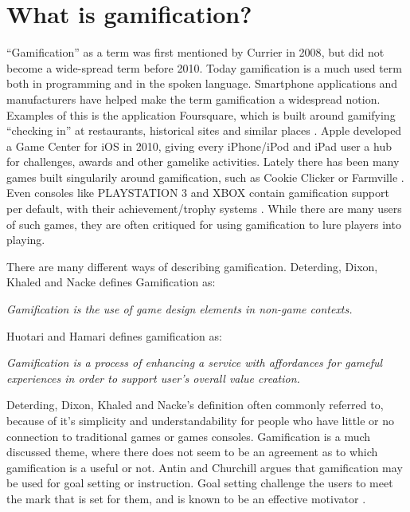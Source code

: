 \section{What is gamification?}
\label{sec:gamification}

``Gamification'' as a term was first mentioned by Currier in 2008\cite{gamificationcurrier}, but did not become a wide-spread term before 2010. Today gamification is a much used term both in programming and in the spoken language. Smartphone applications and manufacturers have helped make the term gamification a widespread notion. Examples of this is the application Foursquare, which is built around gamifying ``checking in'' at restaurants, historical sites and similar places \cite{foursquare}. Apple developed a Game Center for iOS in 2010, giving every iPhone/iPod and iPad user a hub for challenges, awards and other gamelike activities\cite{applegamecenter}. Lately there has been many games built singularily around gamification, such as Cookie Clicker \cite{cookieclicker} or Farmville \cite{farmville}. Even consoles like PLAYSTATION 3 and XBOX contain gamification support per default, with their achievement/trophy systems \cite{xbox, playstation}. While there are many users of such games, they are often critiqued for using gamification to lure players into playing. 

There are many different ways of describing gamification. Deterding, Dixon, Khaled and Nacke\cite{Deterding:2011:GDE:2181037.2181040} defines Gamification as:

\textit{Gamification is the use of game design elements in non-game
contexts.}

Huotari and Hamari\cite{huotari2012defining} defines gamification as:

\textit{Gamification is a process of enhancing a service with affordances for gameful experiences in order to support user's overall value creation.}

Deterding, Dixon, Khaled and Nacke's definition often commonly referred to, because of it's simplicity and understandability for people who have little or no connection to traditional games or games consoles.
Gamification is a much discussed theme, where there does not seem to be an agreement as to which gamification is a useful or not. 
Antin and Churchill\cite{antin2011badges} argues that gamification may be used for goal setting or instruction. Goal setting challenge the users to meet the mark that is set for them, and is known to be an effective motivator \cite{ling2005using}. 

